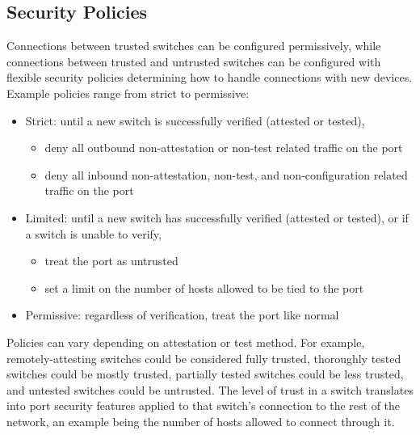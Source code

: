 \documentclass[journal]{IEEEtran}
\begin{document}
\subsection{Security Policies}\label{sec:policies}
Connections between trusted switches can
be configured permissively, while connections between trusted and untrusted switches can be
configured with flexible security policies determining how to handle connections with new devices.
Example policies range from strict to permissive:
\begin{itemize}
  \item Strict: until a new switch is successfully verified (attested or tested),
  \begin{itemize}
    \item deny all outbound non-attestation or non-test related traffic on the port
    \item deny all inbound non-attestation, non-test, and non-configuration related traffic on the
    port
  \end{itemize}
  \item Limited: until a new switch has successfully verified (attested or tested), or if a switch
  is unable to verify,
  \begin{itemize}
    \item treat the port as untrusted
    \item set a limit on the number of hosts allowed to be tied to the port
  \end{itemize}
  \item Permissive: regardless of verification, treat the port like normal
\end{itemize}

Policies can vary depending on attestation or test method. For example, remotely-attesting switches
could be considered fully trusted, thoroughly tested switches could be mostly trusted, partially
tested switches could be less trusted, and untested switches could be untrusted. The level of trust
in a switch translates into port security features applied to that switch's connection to the rest
of the network, an example being the number of hosts allowed to connect through it.

\end{document}
